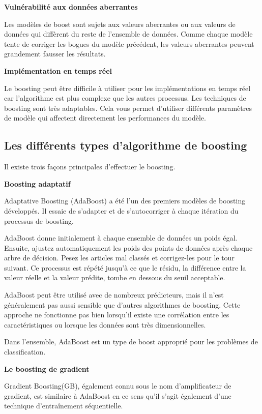 \documentclass[french,a4paper,12pt]{article}
\begin{document}
\textbf{Vulnérabilité aux données aberrantes }

\quad Les modèles de boost sont sujets aux valeurs aberrantes ou aux valeurs de données qui diffèrent du reste de l'ensemble de données. Comme chaque modèle tente de corriger les bogues du modèle précédent, les valeurs aberrantes peuvent grandement fausser les résultats\citep{AWS}.


\textbf{Implémentation en temps réel}

\quad Le boosting peut être difficile à utiliser pour les implémentations en temps réel car l'algorithme est plus complexe que les autres processus. Les techniques de boosting sont très adaptables. Cela vous permet d'utiliser différents paramètres de modèle qui affectent directement les performances du modèle.

\subsection{ Les différents types d'algorithme de boosting}


\quad Il existe trois façons principales d’effectuer le boosting.

\textbf{Boosting adaptatif }

\quad Adaptative Boosting (AdaBoost) a été l'un des premiers modèles de boosting développés. Il essaie de s'adapter et de s'autocorriger à chaque itération du processus de boosting.


\quad AdaBoost donne initialement à chaque ensemble de données un poids égal. Ensuite, ajustez automatiquement les poids des points de données après chaque arbre de décision. Pesez les articles mal classés et corrigez-les pour le tour suivant. Ce processus est répété jusqu'à ce que le résidu, la différence entre la valeur réelle et la valeur prédite, tombe en dessous du seuil acceptable\citep{adaboost}.

\quad AdaBoost peut être utilisé avec de nombreux prédicteurs, mais il n'est généralement pas aussi sensible que d'autres algorithmes de boosting. Cette approche ne fonctionne pas bien lorsqu'il existe une corrélation entre les caractéristiques ou lorsque les données sont très dimensionnelles. 

\quad Dans l'ensemble, AdaBoost est un type de boost approprié pour les problèmes de classification. 

\textbf{Le boosting de gradient}

\quad Gradient Boosting(GB), également connu sous le nom d’amplificateur de gradient, est similaire à AdaBoost en ce sens qu'il s'agit également d'une technique d'entraînement séquentielle.
\end{document}
